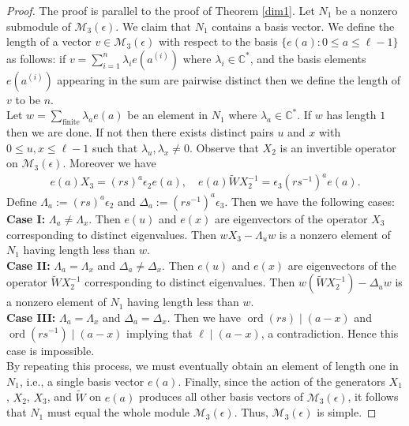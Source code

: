 \documentclass[12 pt,reqno]{amsart}
\numberwithin{equation}{section}
\DeclareMathOperator{\ord}{ord}
\theoremstyle{definition}
\theoremstyle{definition}
\theoremstyle{remark}
\theoremstyle{remark}
\begin{document}
\begin{proof}
    The proof is parallel to the proof of Theorem \ref{dim1}. Let $N_1$ be a nonzero submodule of $\mathcal{M}_3(\epsilon)$. We claim that $N_1$ contains a basis vector. We define the length of a vector $v \in \mathcal{M}_3(\epsilon)$ with respect to the basis $\{e(a): 0 \leq a \leq \ell-1\}$ as follows: if $v=\sum_{i=1}^{n}\lambda_{i}e(a^{(i)})$ where $\lambda_i \in \mathbb{C}^*$, and the basis elements $e(a^{(i)})$ appearing in the sum are pairwise distinct then we define the length of $v$ to be $n$.\\
    Let $w=\sum_{\text{finite}}\lambda_{a}e(a)$ be an element in $N_1$ where $\lambda_{a} \in \mathbb{C}^*$. If $w$ has length $1$ then we are done. If not then there exists distinct pairs $u$ and $x$ with $0 \leq u,x \leq \ell-1$ such that $\lambda_{u},\lambda_{x} \neq 0$. Observe that $X_2$ is an invertible operator on $\mathcal{M}_3(\epsilon)$. Moreover we have
    \begin{align*}
        e(a)X_3=(rs)^a\epsilon_2e(a), \quad e(a)\tilde{W}X_2^{-1}=\epsilon_3(rs^{-1})^ae(a).
    \end{align*}
    Define $\Lambda_a:=(rs)^a\epsilon_2$ and $\Delta_a:=(rs^{-1})^a\epsilon_3$. Then we have the following cases:\\
    \textbf{Case I:} $\Lambda_a\neq \Lambda_x$. Then $e(u)$ and $e(x)$ are eigenvectors of the operator $X_3$ corresponding to distinct eigenvalues. Then $wX_3-\Lambda_{u}w$ is a nonzero element of $N_1$ having length less than $w$.\\
    \textbf{Case II:} $\Lambda_a= \Lambda_x$ and $\Delta_a\neq \Delta_x$. Then $e(u)$ and $e(x)$ are eigenvectors of the operator $\tilde{W}X_2^{-1}$ corresponding to distinct eigenvalues. Then $w\left(\tilde{W}X_2^{-1}\right)-\Delta_{u}w$ is a nonzero element of $N_1$ having length less than $w$.\\
    \textbf{Case III:}  $\Lambda_a= \Lambda_x$ and $\Delta_a =\Delta_x$. Then we have $\ord(rs)\mid (a-x)$ and $\ord(rs^{-1})\mid (a-x)$ implying that $\ell \mid (a-x)$, a contradiction. Hence this case is impossible. \\
   \noindent By repeating this process, we must eventually obtain an element of length one in $N_1$, i.e., a single basis vector $e(a)$. Finally, since the action of the generators $X_1$, $X_2$, $X_3$, and $\tilde{W}$ on $e(a)$ produces all other basis vectors of $\mathcal{M}_3(\epsilon)$, it follows that $N_1$ must equal the whole module $\mathcal{M}_3(\epsilon)$. Thus, $\mathcal{M}_3(\epsilon)$ is simple.
\end{proof}
\end{document}
